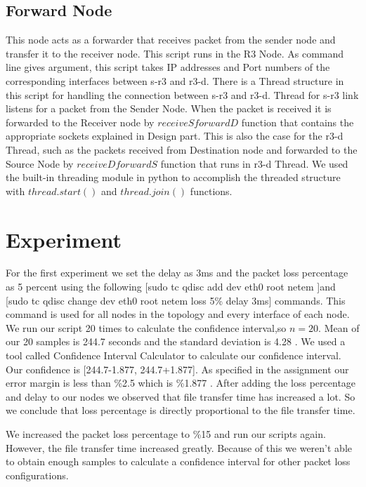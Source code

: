 \documentclass[conference]{IEEEtran}
\begin{document}
\subsection{Forward Node}
This node acts as a forwarder that receives packet from the sender node and transfer it to the receiver node. This script runs in the R3 Node. As command line gives  argument, this script takes IP addresses and Port numbers of the corresponding interfaces between s-r3 and r3-d. There is a Thread structure in this script for handling the connection between s-r3 and r3-d. Thread for s-r3 link listens for a packet from the Sender Node. When the packet is received it is forwarded to the Receiver node by $receiveSforwardD$ function that contains the appropriate sockets explained in Design part. This is also the case for the r3-d Thread, such as the packets received from Destination node and forwarded to the Source Node by $receiveDforwardS$ function that runs in r3-d Thread. We used the built-in threading module in python to accomplish the threaded structure with $thread.start()$ and $thread.join()$ functions. 

\section{Experiment}
For the first experiment we set the delay as 3ms and the packet loss percentage as 5 percent using the following [sudo tc qdisc add dev eth0 root netem ]and [sudo tc qdisc change dev eth0 root netem loss 5\% delay 3ms] commands. This command is used for all nodes in the topology and every interface of each node. We run our script 20 times to calculate the confidence interval,so $n=20$. Mean of our 20 samples is 244.7 seconds and the standard deviation is 4.28 . We used a tool called Confidence Interval Calculator to calculate our confidence interval. Our confidence is [244.7-1.877, 244.7+1.877]. As specified in the assignment our error margin is less than \%2.5 which is \%1.877 . After adding the loss percentage and delay to our nodes we observed that file transfer time has increased a lot. So we conclude that loss percentage is directly proportional to the file transfer time.

We increased the packet loss percentage to \%15 and run our scripts again. However, the file transfer time increased greatly. Because of this we weren't able to obtain enough samples to calculate a confidence interval for other packet loss configurations.
\end{document}
